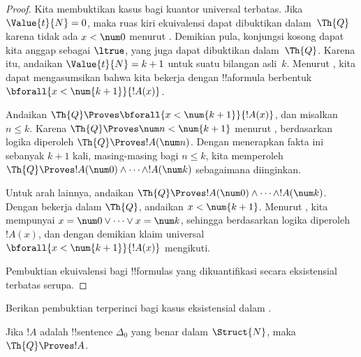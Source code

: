 \documentclass[../../../include/open-logic-section]{subfiles}
\begin{document}
\begin{proof}
    Kita membuktikan kasus bagi kuantor universal terbatas. Jika
    $\Value{t}{N} = 0$, maka ruas kiri ekuivalensi dapat dibuktikan
    dalam~$\Th{Q}$ karena tidak ada $x<\num 0$ menurut
    . Demikian pula, konjungsi kosong
    dapat kita anggap sebagai $\ltrue$, yang juga dapat dibuktikan
    dalam~$\Th{Q}$.
    Karena itu, andaikan $\Value{t}{N} = k+1$ untuk suatu bilangan asli~$k$.
    Menurut , kita dapat mengasumsikan bahwa
    kita bekerja dengan !!a{formula} berbentuk
    $\bforall{x<\num{k+1}}{!A(x)}$.

    Andaikan $\Th{Q} \Proves \bforall{x<\num{k+1}}{!A(x)}$, dan misalkan
    $n \leq k$. Karena $\Th{Q} \Proves \num n < \num{k+1}$ menurut
    , berdasarkan logika diperoleh
    $\Th{Q} \Proves !A(\num n)$. Dengan menerapkan fakta ini sebanyak $k+1$
    kali, masing-masing bagi $n \leq k$, kita memperoleh
    $\Th{Q} \Proves !A(\num 0) \land \dots \land !A(\num k)$ sebagaimana
    diinginkan.

    Untuk arah lainnya, andaikan
    $\Th{Q} \Proves !A(\num 0) \land \dots \land !A(\num k)$. Dengan
    bekerja dalam $\Th{Q}$, andaikan $x < \num{k+1}$. Menurut
    , kita mempunyai
    $x = \num 0 \lor \dots \lor x = \num k$, sehingga berdasarkan logika
    diperoleh~$!A(x)$, dan dengan demikian klaim universal
    $\bforall{x<\num{k+1}}{!A(x)}$ mengikuti.

    Pembuktian ekuivalensi bagi !!{formula}s yang dikuantifikasi secara
    eksistensial terbatas serupa.
\end{proof}

\begin{prob}
Berikan pembuktian terperinci bagi kasus eksistensial dalam
.
\end{prob}

\begin{lem}
Jika $!A$ adalah !!{sentence} $\Delta_0$ yang benar dalam $\Struct{N}$,
maka $\Th{Q} \Proves !A$.
\end{lem}
\end{document}
